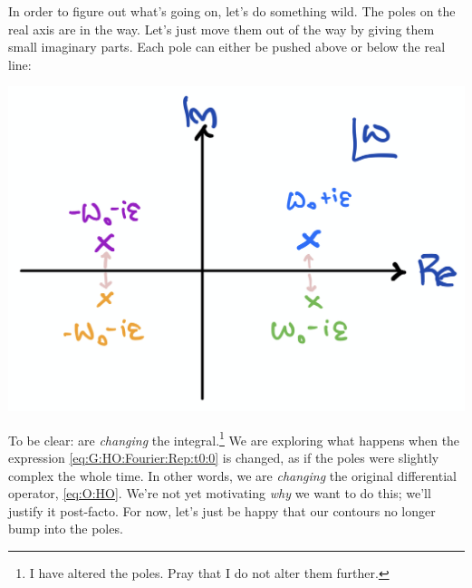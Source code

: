 \documentclass[
  11pt,
	colorful,
	raggedright,
]{tufte-style-thesis-flip}
\begin{document}
In order to figure out what's going on, let's do something wild. The poles on the real axis are in the way. Let's just move them out of the way by giving them small imaginary parts. Each pole can either be pushed above or below the real line:
\begin{center}
\includegraphics[width=.4\textwidth]{figures/Lec_2017_16_HO_PoleShift.png}
\end{center}
To be clear: are \emph{changing} the integral.\footnote{I have altered the poles. Pray that I do not alter them further.} We are exploring what happens when the expression \eqref{eq:G:HO:Fourier:Rep:t0:0} is changed, as if the poles were slightly complex the whole time. In other words, we are \emph{changing} the original differential operator, \eqref{eq:O:HO}. We're not yet motivating \emph{why} we want to do this; we'll justify it post-facto. For now, let's just be happy that our contours no longer bump into the poles. 
\end{document}
